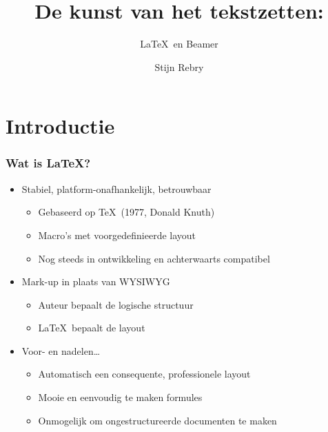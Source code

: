 \documentclass
[kulak,handout] %
{kulakbeamer}
\title[\LaTeX\ en Beamer]{De kunst van het tekstzetten:}
\subtitle{\LaTeX\ en Beamer}
\author{Stijn Rebry}
\institute[Kulak]{KU Leuven Kulak}
\date{}
\begin{document}
\begin{titleframe}
\titlepage
\end{titleframe}

\section{Introductie}

\begin{frame}[t]
\frametitle{Wat is LaTeX?}
\begin{itemize}
\item Stabiel, platform-onafhankelijk, betrouwbaar
\begin{itemize}
\item Gebaseerd op \TeX\ (1977, Donald Knuth)
\item Macro's met voorgedefinieerde layout
\item Nog steeds in ontwikkeling en achterwaarts compatibel
\end{itemize}
\item Mark-up in plaats van WYSIWYG
\begin{itemize}
\item Auteur bepaalt de logische structuur
\item \LaTeX\ bepaalt de layout
\end{itemize}
\item Voor- en nadelen\ldots
\begin{itemize}
\item Automatisch een consequente, professionele layout
\item Mooie en eenvoudig te maken formules
\item Onmogelijk om ongestructureerde documenten te maken
\end{itemize}
\end{itemize}
\end{frame}

\end{document}

